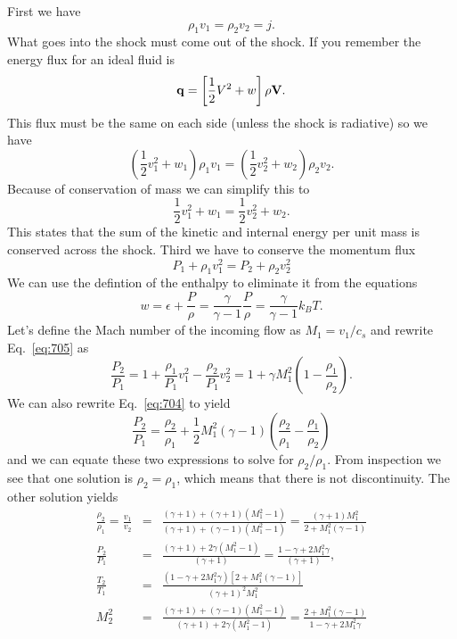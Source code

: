 First we have
\begin{equation}
\rho_1 v_1 = \rho_2 v_2 = j.
\label{eq:701}
\end{equation}
What goes into the shock must come out of the shock.  If you remember
the energy flux for an ideal fluid is
\begin{equation}
{\bf q} = \left [ \frac{1}{2} V^2 + w \right ] \rho {\bf V} .
\label{eq:702}
\end{equation}
This flux must be the same on each side (unless the shock is
radiative) so we have
\begin{equation}
\left ( \frac{1}{2} v_1^2 + w_1  \right ) \rho_1 v_1 = 
\left ( \frac{1}{2} v_2^2 + w_2  \right ) \rho_2 v_2 .
\label{eq:703}
\end{equation}
Because of conservation of mass we can simplify this to
\begin{equation}
 \frac{1}{2} v_1^2 + w_1 = \frac{1}{2} v_2^2 + w_2.
\label{eq:704}
\end{equation}
This states that the sum of the kinetic and internal energy per unit
mass is conserved across the shock.   Third we have to conserve the
momentum flux
\begin{equation}
P_1 + \rho_1 v_1^2 = P_2 + \rho_2 v_2^2
\label{eq:705}
\end{equation}
We can use the defintion of the enthalpy to eliminate it from the
equations
\begin{equation}
w = \epsilon + \frac{P}{\rho} = \frac{\gamma}{\gamma-1} \frac{P}{\rho} = 
 \frac{\gamma}{\gamma-1} k_B T.
\end{equation}
Let's define the Mach number of the incoming flow as $M_1=v_1/c_s$ and
rewrite Eq.~\ref{eq:705} as
\begin{equation}
\frac{P_2}{P_1} = 1 + \frac{\rho_1}{P_1} v_1^2 - \frac{\rho_2}{P_1}
v_2^2 = 1 + \gamma M_1^2 \left ( 1 -  \frac{\rho_1}{\rho_2} \right ).
\label{eq:837}
\end{equation}
We can also rewrite Eq.~\ref{eq:704} to yield
\begin{equation}
\frac{P_2}{P_1} = \frac{\rho_2}{\rho_1} + \frac{1}{2} M_1^2 \left
  (\gamma-1\right ) \left( \frac{\rho_2}{\rho_1} -
  \frac{\rho_1}{\rho_2} \right )
\label{eq:842}
\end{equation}
and we can equate these two expressions to solve for $\rho_2/\rho_1$.
From inspection we see that one solution is $\rho_2=\rho_1$, which
means that there is not discontinuity.   The other solution yields
\begin{eqnarray}
\frac{\rho_2}{\rho_1} = \frac{v_1}{v_2} &=& \frac{(\gamma+1) + (\gamma+1)
( M_1^2 - 1 )}{(\gamma+1)+(\gamma-1) (M_1^2-1)} = \frac{(\gamma+1)
  M_1^2}{2 + M_1^2 (\gamma-1)} \label{eq:679}\\
\frac{P_2}{P_1} &=&  \frac{(\gamma+1) + 2\gamma (M_1^2 -
  1)}{(\gamma+1)} = \frac{1-\gamma + 2 M_1^2 \gamma }{(\gamma+1)}, \\
\frac{T_2}{T_1} &=& \frac{(1-\gamma+2 M_1^2 \gamma) [2 + M_1^2
  (\gamma-1)]}{(\gamma+1)^2 M_1^2} \\
M_2^2 &=& \frac{(\gamma+1)+(\gamma-1) (M_1^2-1)}{(\gamma+1) + 2\gamma (M_1^2 -
  1)} = \frac{2+M_1^2(\gamma-1) }{1 - \gamma + 2  M_1^2\gamma}
\label{eq:706}
\end{eqnarray}
